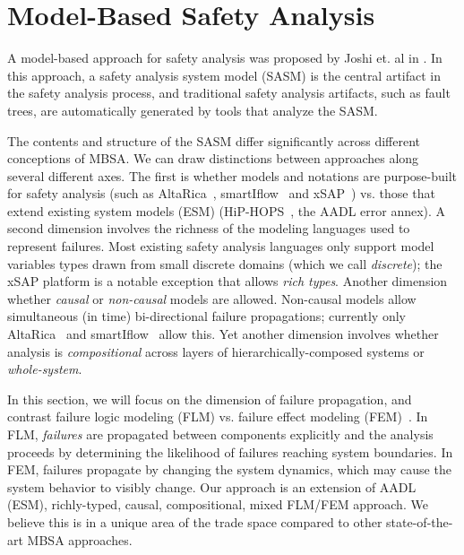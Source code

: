 \section{Model-Based Safety Analysis}


A model-based approach for safety analysis was proposed by Joshi et. al in \cite{Joshi05:Dasc, Joshi05:SafeComp, Joshi07:Hase}.  In this approach, a safety analysis system model (SASM) is the central artifact in the safety analysis process, and traditional safety analysis artifacts, such as fault trees, are automatically generated by tools that analyze the SASM. 

The contents and structure of the SASM differ significantly across different conceptions of MBSA.  We can draw distinctions between approaches along several different axes.  The first is whether models and notations are purpose-built for safety analysis (such as AltaRica~\cite{PROSVIRNOVA2013127}, smartIflow~\cite{info8010007} and xSAP~\cite{DBLP:conf/tacas/BittnerBCCGGMMZ16}) vs. those that extend existing system models (ESM) (HiP-HOPS~\cite{CHEN201391}, the AADL error annex\cite{SAEAS}).  A second dimension involves the richness of the modeling languages used to represent failures.  Most existing safety analysis languages only support model variables types drawn from small discrete domains (which we call {\em discrete}); the xSAP platform is a notable exception that allows {\em rich types}.  Another dimension whether {\em causal } or {\em non-causal} models are allowed.  Non-causal models allow simultaneous (in time) bi-directional failure propagations; currently only AltaRica~\cite{PROSVIRNOVA2013127} and smartIflow~\cite{info8010007} allow this.  Yet another dimension involves whether analysis is {\em compositional} across layers of hierarchically-composed systems or {\em whole-system}.

In this section, we will focus on the dimension of failure propagation, and contrast failure logic modeling (FLM) vs. failure effect modeling (FEM)~\cite{5979344}.  In FLM, {\em failures} are propagated between components explicitly and the analysis proceeds by determining the likelihood of failures reaching system boundaries.  In FEM, failures propagate by changing the system dynamics, which may cause the system behavior to visibly change.  Our approach is an extension of AADL (ESM), richly-typed, causal, compositional, mixed FLM/FEM approach. We believe this is in a unique area of the trade space compared to other state-of-the-art MBSA approaches.

